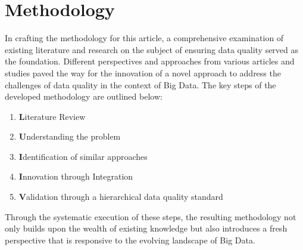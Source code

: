 \documentclass[10pt,a4paper]{article}
\begin{document}
\section{Methodology}
In crafting the methodology for this article, a comprehensive examination of existing literature and research on the subject of ensuring data quality served as the foundation. Different perspectives and approaches from various articles and studies paved the way for the innovation of a novel approach to address the challenges of data quality in the context of Big Data. The key steps of the developed methodology are outlined below:
\begin{enumerate}
    \item \textbf Literature Review
    \item \textbf Understanding the problem
    \item \textbf Identification of similar approaches
    \item \textbf Innovation through Integration
    \item \textbf Validation through a hierarchical data quality standard
\end{enumerate}
Through the systematic execution of these steps, the resulting methodology not only builds upon the wealth of existing knowledge but also introduces a fresh perspective that is responsive to the evolving landscape of Big Data.
\end{document}
